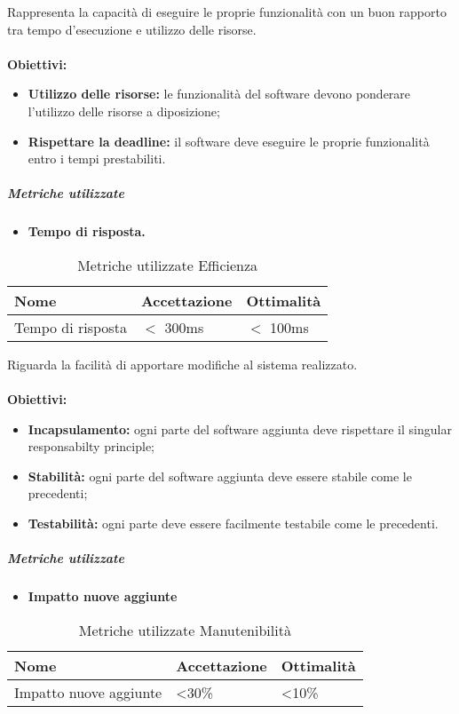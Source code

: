 Rappresenta la capacità di eseguire le proprie funzionalità con un buon rapporto tra tempo d'esecuzione e utilizzo delle risorse.\\\\
\textbf{Obiettivi:}
\begin{itemize}
	\item \textbf{Utilizzo delle risorse:} le funzionalità del software devono ponderare l'utilizzo delle risorse a diposizione;
	\item \textbf{Rispettare la deadline:} il software deve eseguire le proprie funzionalità entro i tempi prestabiliti.
\end{itemize}

\subparagraph{Metriche utilizzate}
\begin{itemize}
	\item \textbf{Tempo di risposta.}
\end{itemize}

\begin{table}[!htpb]
	\centering
	\renewcommand{\arraystretch}{2} 
		\begin{tabular}{|l|l|l|}
			\rowcolor{orange!50}
			\hline
			\textbf{Nome} & \textbf{Accettazione} & \textbf{Ottimalità} \\ \hline
			Tempo di risposta        &           $<$ 300ms            &      $<$ 100ms         \\ \hline                       
		\end{tabular}
	\caption{Metriche utilizzate Efficienza}
\end{table}
\newpage
{}
Riguarda la facilità di apportare modifiche al sistema realizzato.\\\\
\textbf{Obiettivi:}
\begin{itemize}
	\item \textbf{Incapsulamento:} ogni parte del software aggiunta deve rispettare il singular responsabilty principle\pedice;
	\item \textbf{Stabilità:} ogni parte del software aggiunta deve essere stabile come le precedenti;
	\item \textbf{Testabilità:} ogni parte deve essere facilmente testabile come le precedenti.
\end{itemize}

\subparagraph{Metriche utilizzate}
\begin{itemize}
	\item \textbf{Impatto nuove aggiunte}
\end{itemize}
\begin{table}[!htpb]
	\centering
	\renewcommand{\arraystretch}{2} 
		\begin{tabular}{|l|l|l|}
			\rowcolor{orange!50}
			\hline
			\textbf{Nome} & \textbf{Accettazione} & \textbf{Ottimalità} \\ \hline
			Impatto nuove aggiunte        &          <30\%            &      <10\%         \\ \hline                       
		\end{tabular}
	\caption{Metriche utilizzate Manutenibilità}
\end{table}
\newpage
